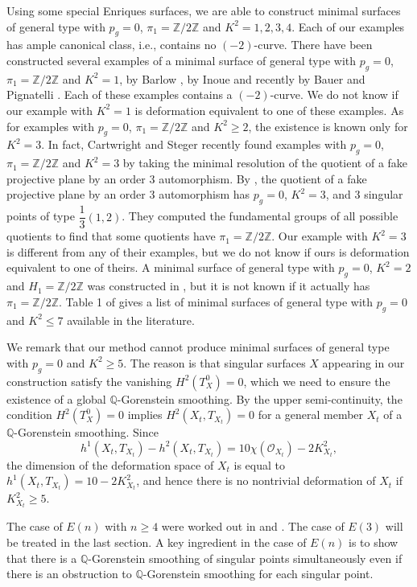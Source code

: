 \documentclass[twoside,11pt]{amsart}
\begin{document}
Using some special Enriques surfaces, we are able to construct
minimal surfaces of general type with $p_g=0$, $\pi_1={{\mathbb Z}}/2{{\mathbb Z}}$
and $K^2=1, 2, 3, 4$. Each of our examples has ample canonical
class, i.e., contains no $(-2)$-curve. There have been constructed
several examples of a minimal surface of general type with
$p_g=0$, $\pi_1={{\mathbb Z}}/2{{\mathbb Z}}$ and $K^2=1$, by Barlow \cite{Bar}, by
Inoue \cite{Inoue} and recently by Bauer and Pignatelli \cite{BP}.
Each of these examples contains a $(-2)$-curve. We do not know if
our example with $K^2=1$ is deformation equivalent to one of these
examples. As for examples with $p_g=0$, $\pi_1={{\mathbb Z}}/2{{\mathbb Z}}$ and
$K^2\ge 2$, the existence is known only for $K^2=3$. In fact,
Cartwright and Steger \cite{CS} recently found examples with
$p_g=0$, $\pi_1={{\mathbb Z}}/2{{\mathbb Z}}$ and $K^2=3$ by taking the minimal
resolution of the quotient of a fake projective plane by an order
3 automorphism. By \cite{K08}, the quotient of a fake projective
plane by an order 3 automorphism has $p_g=0$, $K^2=3$, and 3
singular points of type $\dfrac{1}{3}(1,2)$. They computed the
fundamental groups of all possible quotients to find that some
quotients have $\pi_1={{\mathbb Z}}/2{{\mathbb Z}}$. Our example with $K^2=3$ is
different from any of their examples, but we do not know if ours
is deformation equivalent to one of theirs. A minimal surface of
general type with $p_g=0$, $K^2=2$ and $H_1={{\mathbb Z}}/2{{\mathbb Z}}$ was
constructed in \cite{LP2}, but it is not known if it actually has
$\pi_1={{\mathbb Z}}/2{{\mathbb Z}}$. Table 1 of \cite{BCP} gives a list of minimal
surfaces of general type with $p_g = 0$ and $K^2\le 7$ available
in the literature.

We remark that our method cannot produce minimal surfaces of
general type with $p_g = 0$ and $K^2\ge 5$. The reason is that
singular surfaces $X$ appearing in our construction satisfy the
vanishing $H^2(T^0_X)=0$, which we need to ensure the existence of
a global ${{\mathbb Q}}$-Gorenstein smoothing. By the upper semi-continuity,
the condition $H^2(T^0_X)=0$ implies $H^2(X_t, T_{X_t})=0$ for a
general member $X_t$ of a ${{\mathbb Q}}$-Gorenstein smoothing. Since
\[h^1(X_t, T_{X_t})-h^2(X_t, T_{X_t})=10\chi({{\mathcal O}}_{X_t})-2K_{X_t}^2,\]
the dimension of the deformation space of $X_t$ is equal to
$h^1(X_t, T_{X_t})=10-2K_{X_t}^2$, and hence there is no
nontrivial deformation of $X_t$ if $K_{X_t}^2\ge 5$.

{\medskip} The case of $E(n)$ with $n\ge 4$ were worked out in \cite{LP3}
and \cite{Lee}.  The case of $E(3)$ will be treated in the last
section. A key ingredient in the case of $E(n)$ is to show that
there is a ${{\mathbb Q}}$-Gorenstein smoothing of singular points
simultaneously even if there is an obstruction to ${{\mathbb Q}}$-Gorenstein
smoothing for each singular point.
\end{document}
